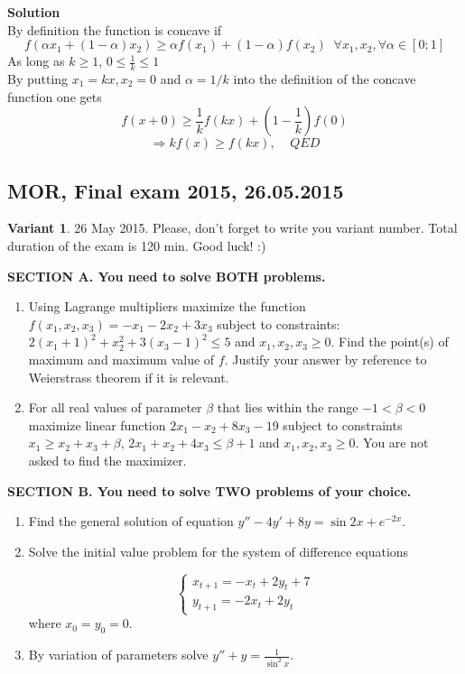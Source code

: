 \documentclass[12pt]{article} %
\theoremstyle{definition} %
\begin{document}
\textbf{Solution} \\
By definition the function is concave if
\[
f(\alpha x_1+(1-\alpha) x_2) \geq \alpha f(x_1)+(1-\alpha) f(x_2) \;\; \forall x_1,x_2, \forall \alpha \in [0;1]
\]
As long as $k\geq 1$, $0\leq \frac 1 k \leq 1$\\
By putting $x_1=kx, x_2=0$ and $\alpha = 1/k$ into the definition of the concave function one gets
\[
f(x + 0) \geq \frac 1 k f(kx) +(1-\frac 1 k) f(0)
\]
\[
\Longrightarrow kf(x) \geq f(kx), \;\;\;\; QED
\]


\subsection{MOR, Final exam 2015, 26.05.2015}

\textbf{Variant 1}. 26 May 2015. Please, don't forget to write you variant number. Total duration of the exam is 120 min. Good luck! :)

\vspace{0.6cm}

\textbf{SECTION A. You need to solve BOTH problems.}

\begin{enumerate}

\item Using Lagrange multipliers maximize  the function $f(x_1,x_2,x_3)=-x_1-2x_2+3x_3$ subject to constraints:   $2(x_1+1)^2+x_2^2+3(x_3-1)^2\leq 5$ and $x_1, x_2, x_3 \geq 0$. Find the point(s) of maximum and maximum value of $f$. Justify your answer by reference to Weierstrass theorem if it is relevant.

\item For all real values of parameter $\beta$ that lies within the range $-1<\beta<0$ maximize linear function $2x_1-x_2+8x_3-19$ subject to constraints  $x_1\geq x_2+x_3+\beta$,  $2x_1+x_2+4x_3\leq \beta+1$ and $x_1, x_2, x_3 \geq 0$. You are not asked to find the maximizer.

\end{enumerate}


\textbf{SECTION B. You need to solve TWO problems of your choice. }

\begin{enumerate}[resume]

\item Find the general solution of equation $y''-4y'+8y=\sin 2x + e^{-2x}$.

\item Solve the initial value problem for the system of difference equations

\[
\begin{cases}
x_{t+1}=-x_t+2y_t+7 \\
y_{t+1}=-2x_t+2y_t
\end{cases}
\]
where $x_0=y_0=0$.

\item By variation of parameters solve $y''+y=\frac{1}{\sin^2 x}$.

\end{enumerate}
\end{document}
